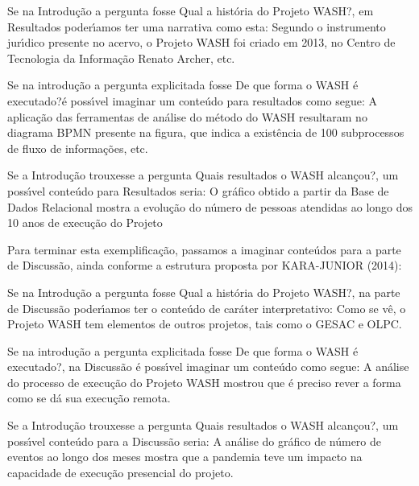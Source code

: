 \documentclass[
12pt,		%
openright,	%
twoside,  %
a4paper,			%
chapter=TITLE,		%
english,			%
french,				%
spanish,			%
brazil				%
]{USPSC-classe/USPSC_RedarTex}
\begin{document}
\begin{alineas}
\item Se na Introdu\c{c}\~ao a pergunta fosse \textquotedbl Qual a hist\'oria do Projeto WASH?\textquotedbl , em Resultados poder\'{\i}amos ter uma narrativa como esta: \textquotedbl Segundo o instrumento jur\'{\i}dico presente no acervo, o Projeto WASH foi criado em 2013, no Centro de Tecnologia da Informa\c{c}\~ao Renato Archer, etc.\textquotedbl 
\item Se na introdu\c{c}\~ao a pergunta explicitada fosse \textquotedbl De que forma o WASH \'e executado?\textquotedbl  \'e poss\'{\i}vel imaginar um conte\'udo para resultados como segue: \textquotedbl A aplica\c{c}\~ao das ferramentas de an\'alise do m\'etodo do WASH resultaram no diagrama BPMN presente na figura, que indica a exist\^encia de 100 subprocessos de fluxo de informa\c{c}\~oes, etc.\textquotedbl 
\item Se a Introdu\c{c}\~ao trouxesse a pergunta \textquotedbl Quais resultados o WASH alcan\c{c}ou?\textquotedbl , um poss\'{\i}vel conte\'udo para Resultados seria: \textquotedbl O gr\'afico obtido a partir da Base de Dados Relacional mostra a evolu\c{c}\~ao do n\'umero de pessoas atendidas ao longo dos 10 anos de execu\c{c}\~ao do Projeto\textquotedbl 
\end{alineas}

Para terminar esta exemplifica\c{c}\~ao, passamos a imaginar conte\'udos para a parte de Discuss\~ao, ainda conforme a estrutura proposta por  KARA-JUNIOR (2014):









\begin{alineas}
\item Se na Introdu\c{c}\~ao a pergunta fosse \textquotedbl Qual a hist\'oria do Projeto WASH?\textquotedbl , na parte de Discuss\~ao poder\'{\i}amos ter o conte\'udo de car\'ater interpretativo: \textquotedbl Como se v\^e, o Projeto WASH tem elementos de outros projetos, tais como o GESAC e OLPC\textquotedbl .
\item Se na introdu\c{c}\~ao a pergunta explicitada fosse \textquotedbl De que forma o WASH \'e executado?\textquotedbl , na Discuss\~ao \'e poss\'{\i}vel imaginar um conte\'udo como segue: \textquotedbl A an\'alise do processo de execu\c{c}\~ao do Projeto WASH mostrou que \'e preciso rever a forma como se d\'a sua execu\c{c}\~ao remota\textquotedbl .
\item Se a Introdu\c{c}\~ao trouxesse a pergunta \textquotedbl Quais resultados o WASH alcan\c{c}ou?\textquotedbl , um poss\'{\i}vel conte\'udo para a Discuss\~ao seria: \textquotedbl A an\'alise do gr\'afico de n\'umero de eventos ao longo dos meses mostra que a pandemia teve um impacto na capacidade de execu\c{c}\~ao presencial do projeto.\textquotedbl 
\end{alineas}
\end{document}
